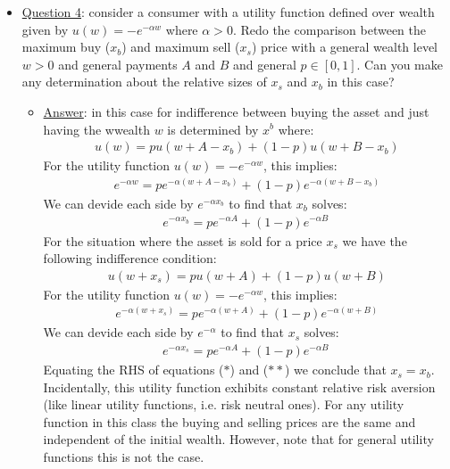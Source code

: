 \documentclass{article}
\begin{document}
  \begin{itemize}
    \item  \underline{Question 4}: consider a consumer with a utility function defined over wealth given by $u(w) = -e^{-\alpha w}$ where $\alpha > 0$. Redo the comparison between the maximum buy ($x_{b}$) and maximum sell ($x_{s}$) price with a general wealth level $w > 0$ and general payments $A$ and $B$ and general $p \in [0, 1]$. Can you make any determination about the relative sizes of $x_{s}$ and $x_{b}$ in this case?
    \begin{itemize}
      \item  \underline{Answer}: in this case for indifference between buying the asset and just having the wwealth $w$ is determined by $x^{b}$ where:
      \begin{gather*}
        u(w) = pu(w + A - x_{b}) + (1-p)u(w + B - x_{b})
      \end{gather*}
      For the utility function $u(w) = -e^{-\alpha w}$, this implies:
      \begin{gather*}
        e^{-\alpha w} = pe^{-\alpha (w + A - x_{b})} + (1-p)e^{-\alpha(w + B - x_{b})}
      \end{gather*}
      We can devide each side by $e^{-\alpha x_{b}}$ to find that $x_{b}$ solves:
      \begin{gather*}
        e^{-\alpha x_{b}} = pe^{-\alpha A} + (1-p)e^{-\alpha B} \ \tag{*}
      \end{gather*}
      For the situation where the asset is sold for a price $x_{s}$ we have the following indifference condition:
      \begin{gather*}
        u(w + x_{s}) = pu(w + A) + (1-p)u(w + B)
      \end{gather*}
      For the utility function $u(w) = -e^{-\alpha w}$, this implies:
      \begin{gather*}
        e^{-\alpha (w + x_{s})} = p e^{-\alpha (w + A)} + (1-p)e^{- \alpha (w + B)}
      \end{gather*}
      We can devide each side by $e^{-\alpha}$ to find that $x_{s}$ solves:
      \begin{gather*}
        e^{-\alpha x_{s}} = pe^{-\alpha A} + (1-p)e^{-\alpha B} \ \tag{**}
      \end{gather*}
      Equating the RHS of equations ($*$) and ($**$) we conclude that $x_{s} = x_{b}$. Incidentally, this utility function exhibits constant relative risk aversion (like linear utility functions, i.e. risk neutral ones). For any utility function in this class the buying and selling prices are the same and independent of the initial wealth. However, note that for general utility functions this is not the case.
    \end{itemize}
  \end{itemize}
\par
\vspace{6mm}
\end{document}
